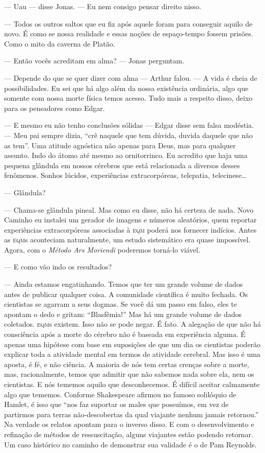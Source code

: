 --- Uau --- disse Jonas. --- Eu nem consigo pensar direito nisso.

--- Todos os outros saltos que eu fiz após aquele foram para conseguir aquilo de novo. É como se nossa realidade e essas noções de espaço-tempo fossem prisões. Como o mito da caverna de Platão.

--- Então vocês acreditam em alma? --- Jonas perguntam.

--- Depende do que se quer dizer com alma --- Arthur falou. --- A vida é cheia de possibilidades. Eu sei que há algo além da nossa existência ordinária, algo que somente com nossa morte física temos acesso. Tudo mais a respeito disso, deixo para os pensadores como Edgar.

--- E mesmo eu não tenho conclusões sólidas --- Edgar disse\mudanca{,} sem falsa modéstia. --- Meu pai sempre dizia, ``crê naquele que tem dúvida, duvida daquele que não as tem''. Uma atitude agnóstica não apenas para Deus, mas para qualquer assunto. Indo do átomo até mesmo ao ornitorrinco. Eu acredito que haja uma pequena glândula em nossos cérebros que está relacionada a diversos desses fenômenos. Sonhos lúcidos, experiências extracorpóreas, telepatia, telecinese\ldots

--- Glândula?

--- Chama-se glândula pineal. Mas\mudanca{,} como eu disse, não há certeza de nada.  Novo Caminho eu instalei um gerador de imagens e números aleatórios, quem reportar experiências extracorpóreas associadas à \textsc{eqm} poderá nos fornecer indícios. Antes as \textsc{eqm}s aconteciam naturalmente, um estudo sistemático era quase impossível. Agora, com o \emph{Método Ars Moriendi}\mudanca{,} poderemos torná-lo viável.

--- E como vão indo os resultados?

--- Ainda estamos engatinhando. Temos que ter um grande volume de dados antes de publicar qualquer coisa. A comunidade científica é muito fechada. Os cientistas se agarram a seus dogmas. Se você dá um passo em falso, eles te apontam o dedo e gritam: ``Blasfêmia!'' Mas há um grande volume de dados coletados. \textsc{eqm}s existem. Isso não se pode negar. É fato. A alegação de que não há consciência após a morte do cérebro não é baseada em experiência alguma. É apenas uma hipótese com base em suposições de que um dia os cientistas poderão explicar toda a atividade mental em termos de atividade cerebral. Mas isso é uma aposta, é fé, e não ciência. A maioria de nós tem certas crenças sobre a morte, mas, racionalmente, temos que admitir que não sabemos nada sobre ela, nem os cientistas. E nós tememos aquilo que desconhecemos. É difícil aceitar calmamente algo que tememos. Conforme Shakespeare afirmou no famoso solilóquio de Hamlet, é isso que ``nos faz suportar os males que possuímos, em vez de partirmos para terras não-descobertas da qual viajante nenhum jamais retornou.'' Na verdade\mudanca{,} os relatos apontam para o inverso disso. E com o desenvolvimento e refinação de métodos de ressuscitação, alguns viajantes estão podendo retornar. Um caso histórico no caminho de demonstrar sua validade é o de Pam Reynolds.

